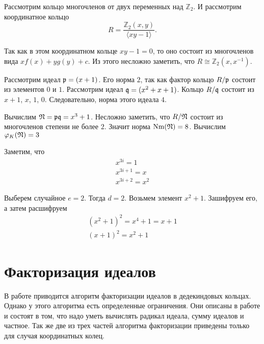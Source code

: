 \documentclass[_00_autoref.tex]{subfiles}
\begin{document}
\begin{example}
    Рассмотрим кольцо многочленов от двух переменных над $\mathbb{Z}_2$. И рассмотрим координатное кольцо
    \begin{equation*}
        R = \frac{\mathbb{Z}_2(x, y)}{\langle xy - 1\rangle}.
    \end{equation*}
    
    Так как в этом координатном кольце $xy - 1 = 0$, то оно состоит из многочленов вида $xf(x) + yg(y) + c$.
    Из этого несложно заметить, что $R \cong \mathbb{Z}_2(x, x^{-1})$.
    
    Рассмотрим идеал $\mathfrak{p} = (x + 1)$.
    Его норма $2$, так как фактор кольцо $R/\mathfrak{p}$ состоит из элементов $0$ и $1$.
    Рассмотрим идеал $\mathfrak{q} = (x^2 + x + 1)$.
    Кольцо $R/\mathfrak{q}$ состоит из $x+1$, $x$, $1$, $0$.
    Следовательно, норма этого идеала $4$.

    Вычислим $\mathfrak{N} = \mathfrak{p}\mathfrak{q} = x^3 + 1$.
    Несложно заметить, что $R/\mathfrak{N}$ состоит из многочленов степени не более $2$.
    Значит норма $\textrm{Nm}(\mathfrak{N}) = 8$.
    Вычислим $\varphi_K(\mathfrak{N}) = 3$

    Заметим, что
    \begin{equation*}
    	\begin{array}{l}
    		x^{3i} = 1\\
    		x^{3i+1} = x\\
    		x^{3i+2} = x^2
    	\end{array}
    \end{equation*}

    Выберем случайное $e = 2$.
    Тогда $d = 2$.
    Возьмем элемент $x^2 + 1$.
    Зашифруем его, а затем расшифруем
    \begin{equation*}
        \begin{split}
            (x^2 + 1)^2 = x^4 + 1 = x + 1\\
            (x + 1)^2 = x^2 + 1
        \end{split}
    \end{equation*}
\end{example}

\section{Факторизация идеалов}

В работе \cite{source:Darkey-Mensah} приводится алгоритм факторизации идеалов в дедекиндовых кольцах.
Однако у этого алгоритма есть определенные ограничения.
Они описаны в работе \cite{source:Darkey-Mensah} и состоят в том, что надо уметь вычислять радикал идеала, сумму идеалов и частное.
Так же две из трех частей алгоритма факторизации приведены только для случая координатных колец.
\end{document}
